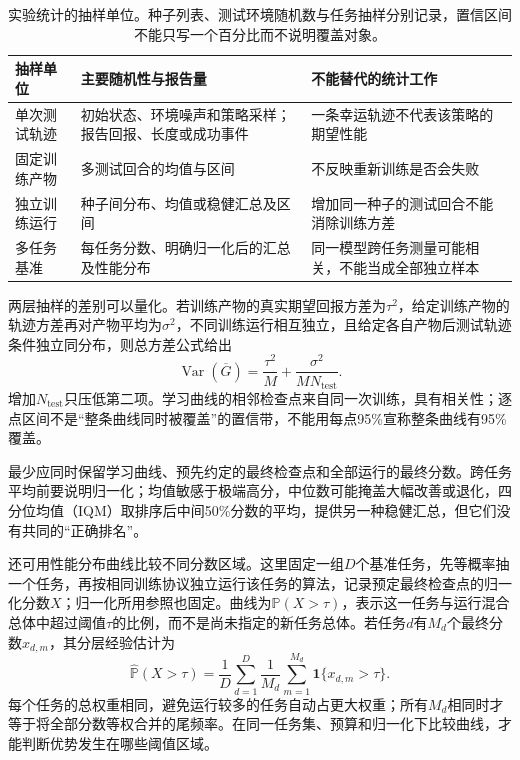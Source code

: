 \begin{table}[t]
  \centering
  \small
  \begin{tabularx}{\linewidth}{>{\raggedright\arraybackslash}p{26mm} >{\raggedright\arraybackslash}X >{\raggedright\arraybackslash}X}
    \toprule
    抽样单位 & 主要随机性与报告量 & 不能替代的统计工作 \\
    \midrule
    单次测试轨迹 & 初始状态、环境噪声和策略采样；报告回报、长度或成功事件 & 一条幸运轨迹不代表该策略的期望性能 \\
    固定训练产物 & 多测试回合的均值与区间 & 不反映重新训练是否会失败 \\
    独立训练运行 & 种子间分布、均值或稳健汇总及区间 & 增加同一种子的测试回合不能消除训练方差 \\
    多任务基准 & 每任务分数、明确归一化后的汇总及性能分布 & 同一模型跨任务测量可能相关，不能当成全部独立样本 \\
    \bottomrule
  \end{tabularx}
  \caption{实验统计的抽样单位。种子列表、测试环境随机数与任务抽样分别记录，置信区间不能只写一个百分比而不说明覆盖对象。}
  \label{tab:rl-learning-statistical-units}
\end{table}

两层抽样的差别可以量化。若训练产物的真实期望回报方差为$\tau^2$，给定训练产物的轨迹方差再对产物平均为$\sigma^2$，不同训练运行相互独立，且给定各自产物后测试轨迹条件独立同分布，则总方差公式给出
\[
 \operatorname{Var}(\overline G)
   =\frac{\tau^2}{M}
      +\frac{\sigma^2}{M N_{\mathrm{test}}}.
\]
增加$N_{\mathrm{test}}$只压低第二项。学习曲线的相邻检查点来自同一次训练，具有相关性；逐点区间不是“整条曲线同时被覆盖”的置信带，不能用每点95\%宣称整条曲线有95\%覆盖。

最少应同时保留学习曲线、预先约定的最终检查点和全部运行的最终分数。跨任务平均前要说明归一化；均值敏感于极端高分，中位数可能掩盖大幅改善或退化，四分位均值（IQM）取排序后中间50\%分数的平均，提供另一种稳健汇总，但它们没有共同的“正确排名”。

还可用性能分布曲线比较不同分数区域。这里固定一组$D$个基准任务，先等概率抽一个任务，再按相同训练协议独立运行该任务的算法，记录预定最终检查点的归一化分数$X$；归一化所用参照也固定。曲线为$\mathbb P(X>\tau)$，表示这一任务与运行混合总体中超过阈值$\tau$的比例，而不是尚未指定的新任务总体。若任务$d$有$M_d$个最终分数$x_{d,m}$，其分层经验估计为
\[
  \widehat{\mathbb P}(X>\tau)
    =\frac1D\sum_{d=1}^{D}\frac1{M_d}
       \sum_{m=1}^{M_d}\mathbf1\{x_{d,m}>\tau\}.
\]
每个任务的总权重相同，避免运行较多的任务自动占更大权重；所有$M_d$相同时才等于将全部分数等权合并的尾频率。在同一任务集、预算和归一化下比较曲线，才能判断优势发生在哪些阈值区域。

